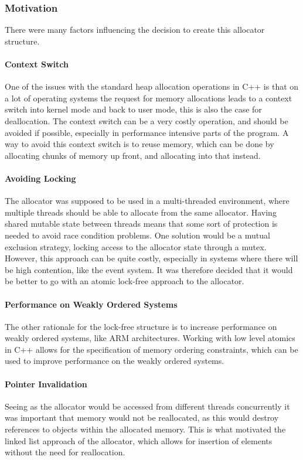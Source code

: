 \subsubsection{Motivation}
There were many factors influencing the decision to create this allocator structure.

\paragraph{Context Switch}
One of the issues with the standard heap allocation operations in C++ is that
on a lot of operating systems the request for memory allocations leads to a context switch into
kernel mode and back to user mode, this is also the case for deallocation.
The context switch can be a very costly operation, and should be avoided
if possible, especially in performance intensive parts of the program\cite[p. 240]{game_engine_architecture}.
A way to avoid this context switch is to reuse memory, which can be done by allocating
chunks of memory up front, and allocating into that instead.

\paragraph{Avoiding Locking}
The allocator was supposed to be used in a multi-threaded environment, where multiple threads
should be able to allocate from the same allocator.
Having shared mutable state between threads means that some sort of protection is needed
to avoid race condition problems.
One solution would be a mutual exclusion strategy, locking access to the allocator state through a mutex.
However, this approach can be quite costly, especially in systems where there will be high contention,
like the event system.
It was therefore decided that it would be better to go with an atomic lock-free approach to the allocator.

\paragraph{Performance on Weakly Ordered Systems}
The other rationale for the lock-free structure is to increase performance on weakly ordered systems,
like ARM architectures\cite{preshing_weak_vs_strong_memory_models}.
Working with low level atomics in C++ allows for the specification of memory ordering constraints,
which can be used to improve performance on the weakly ordered systems.

\paragraph{Pointer Invalidation}
Seeing as the allocator would be accessed from different threads concurrently it was important that
memory would not be reallocated, as this would destroy references to objects within the allocated memory.
This is what motivated the linked list approach of the allocator, which allows for insertion of elements without
the need for reallocation.

